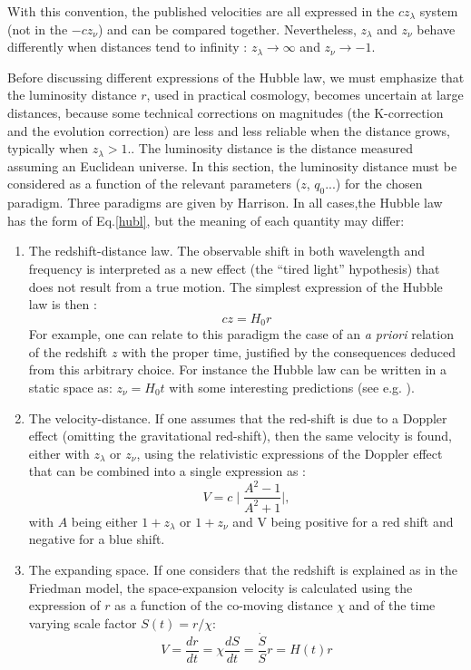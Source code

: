  With this convention, the published velocities  are all expressed in the $c z_{\lambda}$  system (not in the  $-c z_{\nu}$) and can be compared together. Nevertheless,  $z_{\lambda}$ and $z_{\nu}$ behave differently when distances tend to infinity : $z_{\lambda} \to \infty$ and  $z_{\nu} \to - 1$.

Before discussing  different expressions of the Hubble law, we must emphasize that the luminosity distance $r$, used in practical  cosmology, becomes uncertain at large distances, because some technical corrections on magnitudes (the K-correction and the evolution correction) are less and less reliable when the distance grows, typically when $z_\lambda > 1.$. The luminosity distance is the distance measured assuming an Euclidean universe. In this section, the luminosity distance must be considered as a function of the relevant parameters ($z$, $q_0$...) for the chosen paradigm. Three paradigms are given by Harrison\cite{harrison1}. In all cases,the Hubble law has the form of Eq.\ref{hubl}, but the meaning of each quantity may differ:
\begin{enumerate}
\item The redshift-distance law. The observable shift  in both wavelength and frequency is interpreted as a new effect (the “tired light” hypothesis) that does not result from a true motion. The simplest expression of the Hubble law is then :
\begin{equation}
{c}z={H_0} r 
\label{hl1a}
\end{equation}
For example, one can relate to this paradigm the case of an {\it{a priori}} relation of the redshift $z$ with the proper time, justified by the consequences deduced from this arbitrary choice.  For instance the Hubble law can be written in a static space as: $z_{\nu}=H_0 t$ with some interesting predictions (see e.g. \cite{yhs}).

\item The velocity-distance. If one assumes that the red-shift is due to a Doppler effect (omitting the gravitational red-shift), then the same velocity is found, either with $z_{\lambda}$ or $z_{\nu}$, using the relativistic expressions of the Doppler effect that can be combined into a single expression as :
\begin{equation}
V=c  \mid \frac{A^2-1}{A^2+1} \mid,
\label{vdop}
\end{equation}
with $A$ being either $1+z_{\lambda}$ or $1+z_{\nu}$ and V being positive for a red shift and negative for a blue shift. 

\item The expanding space.  If one considers that the redshift is explained as in the Friedman model, the space-expansion velocity is calculated using the expression of $r$ as a function of the co-moving distance $\chi$ and of the  time varying scale factor $S(t)=r/\chi$:
\begin{equation}
 V = \frac{dr}{dt}= \chi  \frac{dS}{dt} =  \frac{\dot{S}}{S} r = H(t)r
\label{friedmann}
\end{equation}
\end{enumerate}

